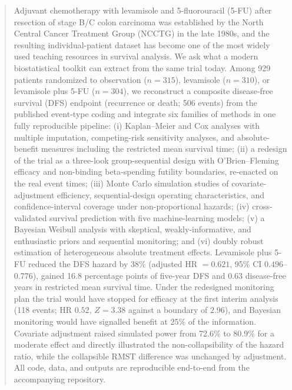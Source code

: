 \documentclass[11pt,a4paper]{article}
\begin{document}
\begin{abstract}
\noindent
Adjuvant chemotherapy with levamisole and 5-fluorouracil (5-FU) after
resection of stage B/C colon carcinoma was established by the North
Central Cancer Treatment Group (NCCTG) in the late 1980s, and the
resulting individual-patient dataset has become one of the most widely
used teaching resources in survival analysis. We ask what a modern
biostatistical toolkit can extract from the same trial today. Among 929
patients randomized to observation ($n=315$), levamisole ($n=310$), or
levamisole plus 5-FU ($n=304$), we reconstruct a composite disease-free
survival (DFS) endpoint (recurrence or death; 506 events) from the
published event-type coding and integrate six families of methods in one
fully reproducible pipeline: (i) Kaplan--Meier and Cox analyses with
multiple imputation, competing-risk sensitivity analyses, and
absolute-benefit measures including the restricted mean survival time;
(ii) a redesign of the trial as a three-look group-sequential design with
O'Brien--Fleming efficacy and non-binding beta-spending futility
boundaries, re-enacted on the real event times; (iii) Monte Carlo
simulation studies of covariate-adjustment efficiency, sequential-design
operating characteristics, and confidence-interval coverage under
non-proportional hazards; (iv) cross-validated survival prediction with
five machine-learning models; (v) a Bayesian Weibull analysis with
skeptical, weakly-informative, and enthusiastic priors and sequential
monitoring; and (vi) doubly robust estimation of heterogeneous absolute
treatment effects. Levamisole plus 5-FU reduced the DFS hazard by 38\%
(adjusted HR $=0.621$, 95\% CI $0.496$--$0.776$), gained 16.8 percentage
points of five-year DFS and 0.63 disease-free years in restricted mean
survival time. Under the redesigned monitoring plan the trial would have
stopped for efficacy at the first interim analysis (118 events; HR
$0.52$, $Z=3.38$ against a boundary of $2.96$), and Bayesian monitoring
would have signalled benefit at 25\% of the information. Covariate
adjustment raised simulated power from 72.6\% to 80.9\% for a moderate
effect and directly illustrated the non-collapsibility of the hazard
ratio, while the collapsible RMST difference was unchanged by adjustment.
All code, data, and outputs are reproducible end-to-end from the
accompanying repository.
\end{abstract}
\end{document}
